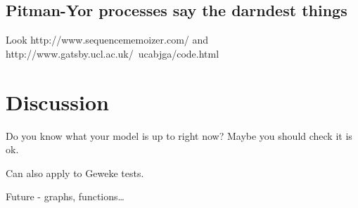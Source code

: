 \documentclass{article}
\begin{document}
\subsection{Pitman-Yor processes say the darndest things}

Look http://www.sequencememoizer.com/ and http://www.gatsby.ucl.ac.uk/~ucabjga/code.html

\section{Discussion}

Do you know what your model is up to right now?
Maybe you should check it is ok.

Can also apply to Geweke tests.

Future - graphs, functions\ldots



\end{document}

